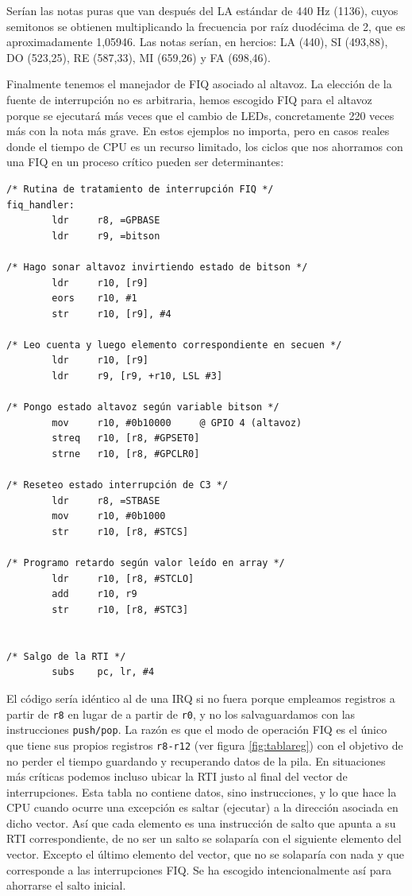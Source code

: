 Serían las notas puras que van después del LA estándar de 440 Hz (1136), cuyos semitonos se
obtienen multiplicando la frecuencia por raíz duodécima de 2, que es aproximadamente 1,05946.
Las notas serían, en hercios: LA (440), SI (493,88), DO (523,25), RE (587,33), MI (659,26) y
FA (698,46).

Finalmente tenemos el manejador de FIQ asociado al altavoz. La elección de la fuente de
interrupción no es arbitraria, hemos escogido FIQ para el altavoz porque se ejecutará más veces
que el cambio de LEDs, concretamente 220 veces más con la nota más grave. En estos ejemplos
no importa, pero en casos reales donde el tiempo de CPU es un recurso limitado, los ciclos
que nos ahorramos con una FIQ en un proceso crítico pueden ser determinantes:

\begin{lstlisting}
/* Rutina de tratamiento de interrupción FIQ */
fiq_handler:
        ldr     r8, =GPBASE
        ldr     r9, =bitson

/* Hago sonar altavoz invirtiendo estado de bitson */
        ldr     r10, [r9]
        eors    r10, #1
        str     r10, [r9], #4

/* Leo cuenta y luego elemento correspondiente en secuen */
        ldr     r10, [r9]
        ldr     r9, [r9, +r10, LSL #3]

/* Pongo estado altavoz según variable bitson */
        mov     r10, #0b10000     @ GPIO 4 (altavoz)
        streq   r10, [r8, #GPSET0]
        strne   r10, [r8, #GPCLR0]

/* Reseteo estado interrupción de C3 */
        ldr     r8, =STBASE
        mov     r10, #0b1000
        str     r10, [r8, #STCS]

/* Programo retardo según valor leído en array */
        ldr     r10, [r8, #STCLO]
        add     r10, r9
        str     r10, [r8, #STC3]


/* Salgo de la RTI */
        subs    pc, lr, #4
\end{lstlisting}

El código sería idéntico al de una IRQ si no fuera porque empleamos registros a partir de
{\tt r8} en lugar de a partir de {\tt r0}, y no los salvaguardamos con las instrucciones
{\tt push/pop}. La razón es que el modo de operación FIQ es el único que tiene sus propios
registros {\tt r8-r12} (ver figura \ref{fig:tablareg}) con el objetivo de no perder el tiempo
guardando y recuperando datos de la pila. En situaciones más críticas podemos incluso ubicar
la RTI justo al final del vector de interrupciones. Esta tabla no contiene datos, sino instrucciones,
y lo que hace la CPU cuando ocurre una excepción es saltar (ejecutar) a la dirección asociada en
dicho vector. Así que cada elemento es una instrucción de salto que apunta a su RTI
correspondiente, de no ser un salto se solaparía con el siguiente elemento del vector. Excepto
el último elemento del vector, que no se solaparía con nada y que corresponde a las
interrupciones FIQ. Se ha escogido intencionalmente así para ahorrarse el salto inicial.

